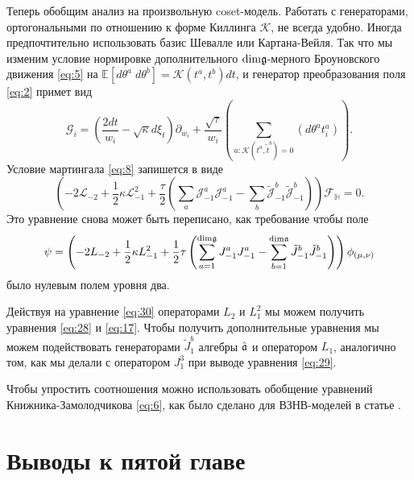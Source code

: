 Теперь обобщим анализ на произвольную  coset-модель. Работать с генераторами, ортогональными по отношению к форме Киллинга $\mathcal{K}$, не всегда удобно. Иногда предпочтительно использовать базис Шевалле или Картана-Вейля. Так что мы изменим условие нормировке дополнительного $\mathrm{dim}\mathfrak{g}$-мерного Броуновского движения \eqref{eq:5} на $\mathbb{E}\left[d\theta^{a}\; d\theta^{b}\right]=\mathcal{K}(t^{a},t^{b})dt$, и генератор преобразования поля  \eqref{eq:2} примет вид 
\begin{equation*}
  \mathcal{G}_{i}=\left(\frac{2dt}{w_{i}}-\sqrt{\kappa} d\xi_{t}\right) \partial_{w_{i}}+\frac{\sqrt{\tau}}{w_{i}}\left(\sum_{a:\mathcal{K}(t^{a},\tilde{t}^{b})=0}\left(d \theta ^{a} t^{a}_{i}\right)\right).
\end{equation*}
Условие мартингала  \eqref{eq:8} запишется в виде
\begin{equation*}
  \left(-2 \mathcal{L}_{-2}+\frac{1}{2}\kappa \mathcal{L}_{-1}^{2}+\frac{\tau}{2}\left( \sum_{a} \mathcal{J}^{a}_{-1} \mathcal{J}^{a}_{-1}-
      \sum_{b}\tilde{\mathcal{J}}^{b}_{-1} \tilde{\mathcal{J}}^{b}_{-1}\right)\right)        \mathcal{F}_{\mathbb{H}}=0.
\end{equation*}
Это уравнение снова может быть переписано, как требование чтобы поле
\begin{equation}
  \psi=\left(-2L_{-2}+\frac{1}{2}\kappa L_{-1}^{2}+\frac{1}{2}\tau \left(\sum_{a=1}^{\mathrm{dim}\mathfrak{g}}J^{a}_{-1}J^{a}_{-1}-\sum_{b=1}^{\mathrm{dim}\mathfrak{a}}\tilde{J}^{b}_{-1}\tilde{J}^{b}_{-1}\right)\right) \phi_{(\mu,\nu)}
\label{eq:30}
\end{equation}
было нулевым полем уровня два.

Действуя на уравнение \eqref{eq:30} операторами  $L_{2}$ и $L_{1}^{2}$ мы можем получить уравнения \eqref{eq:28} и \eqref{eq:17}. Чтобы получить дополнительные уравнения мы можем подействовать генераторами  $\tilde{J}^{b}_{1}$ алгебры $\hat{\mathfrak{a}}$ и оператором $L_{1}$, аналогично том, как мы делали с оператором  $J^{3}_{1}$ при выводе уравнения \eqref{eq:29}. 

Чтобы упростить соотношения можно использовать обобщение уравнений Книжника-Замолодчикова \eqref{eq:6}, как было сделано для ВЗНВ-моделей в статье \cite{alekseev2010sle}. 

\section{Выводы к пятой главе}
\label{sec:conclusion}

